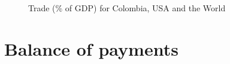 \documentclass[
  ignorenonframetext,
]{beamer}
\begin{document}
\begin{frame}{}
\label{section-3}
\begin{figure}


\caption{\label{fig-trade-col-usa-world}Trade (\% of GDP) for Colombia,
USA and the World}

\end{figure}%
\end{frame}

\section{Balance of payments}\label{balance-of-payments}
\end{document}
